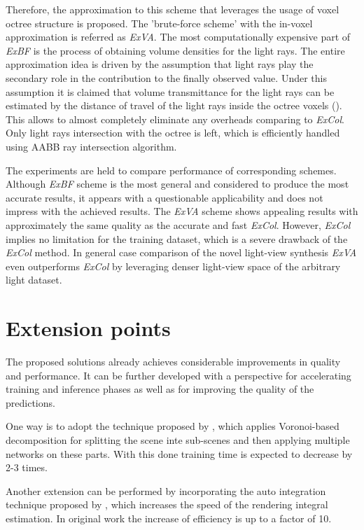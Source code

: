 Therefore, the approximation to this scheme that leverages the usage of voxel octree structure is proposed.
The 'brute-force scheme' with the in-voxel approximation is referred as \textit{ExVA}.
The most computationally expensive part of \textit{ExBF} is the process of
obtaining volume densities for the light rays.
The entire approximation idea is driven by the assumption
that light rays play the secondary role in the contribution to the finally observed value.
Under this assumption it is claimed that volume transmittance for the light rays
can be estimated by the distance of travel of the light rays inside the octree voxels ().
This allows to almost completely eliminate any overheads comparing to \textit{ExCol}.
Only light rays intersection with the octree is left,
which is efficiently handled using AABB ray intersection algorithm.

The experiments are held to compare performance of corresponding schemes.
Although \textit{ExBF} scheme is the most general and considered to produce the most accurate results,
it appears with a questionable applicability and does not impress with the achieved results.
The \textit{ExVA} scheme shows appealing results with approximately the same quality as the accurate and fast \textit{ExCol}.
However, \textit{ExCol} implies no limitation for the training dataset,
which is a severe drawback of the \textit{ExCol} method.
In general case comparison of the novel light-view synthesis \textit{ExVA} 
even outperforms \textit{ExCol} by leveraging denser light-view space of the arbitrary light dataset.



\section{Extension points}

The proposed solutions already achieves considerable improvements in quality and performance.
It can be further developed with a perspective for accelerating training and inference phases
as well as for improving the quality of the predictions.

One way is to adopt the technique proposed by \cite{rebain2020derf},
which applies Voronoi-based decomposition for splitting the scene inte sub-scenes
and then applying multiple networks on these parts.
With this done training time is expected to decrease by 2-3 times.

Another extension can be performed by incorporating the auto integration technique proposed by \cite{lindell2021autoint},
which increases the speed of the rendering integral estimation.
In original work the increase of efficiency is up to a factor of 10.

